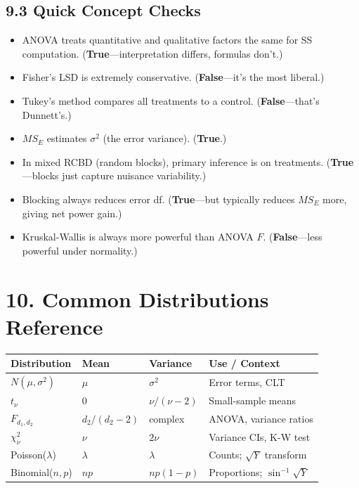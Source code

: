 \documentclass[9pt,letterpaper]{article}
\begin{document}
\subsection{9.3 Quick Concept Checks}

\begin{itemize}
    \item ANOVA treats quantitative and qualitative factors the same for SS computation. (\textbf{True}---interpretation differs, formulas don't.)
    \item Fisher's LSD is extremely conservative. (\textbf{False}---it's the most liberal.)
    \item Tukey's method compares all treatments to a control. (\textbf{False}---that's Dunnett's.)
    \item $MS_E$ estimates $\sigma^2$ (the error variance). (\textbf{True}.)
    \item In mixed RCBD (random blocks), primary inference is on treatments. (\textbf{True}---blocks just capture nuisance variability.)
    \item Blocking always reduces error df. (\textbf{True}---but typically reduces $MS_E$ more, giving net power gain.)
    \item Kruskal-Wallis is always more powerful than ANOVA $F$. (\textbf{False}---less powerful under normality.)
\end{itemize}

\section{10. Common Distributions Reference}

\begin{center}\small
\begin{tabular}{@{}llll@{}}
\toprule
Distribution & Mean & Variance & Use / Context \\
\midrule
$N(\mu, \sigma^2)$ & $\mu$ & $\sigma^2$ & Error terms, CLT \\
$t_\nu$ & 0 & $\nu/(\nu-2)$ & Small-sample means \\
$F_{d_1, d_2}$ & $d_2/(d_2-2)$ & complex & ANOVA, variance ratios \\
$\chi^2_\nu$ & $\nu$ & $2\nu$ & Variance CIs, K-W test \\
Poisson($\lambda$) & $\lambda$ & $\lambda$ & Counts; $\sqrt{Y}$ transform \\
Binomial($n,p$) & $np$ & $np(1-p)$ & Proportions; $\sin^{-1}\!\sqrt{Y}$ \\
\bottomrule
\end{tabular}
\end{center}
\end{document}
